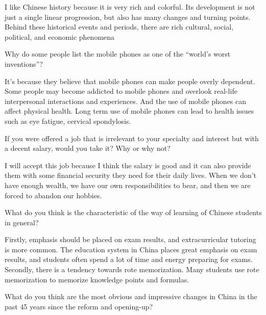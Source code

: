 \documentclass[lang=cn,10pt]{elegantbook}
\begin{document}
\begin{solution}
	I like Chinese history because it is very rich and colorful. Its development is not just a single linear progression, but also has many changes and turning points. Behind these historical events and periods, there are rich cultural, social, political, and economic phenomena
\end{solution}
\begin{example}
	Why do some people list the mobile phones as one of the “world’s worst inventions”? 
\end{example}
\begin{solution}
	It's because they believe that mobile phones can make people overly dependent. Some people may become addicted to mobile phones and overlook real-life interpersonal interactions and experiences. And the use of mobile phones can affect physical health. Long term use of mobile phones can lead to health issues such as eye fatigue, cervical spondylosis.
\end{solution}
\begin{example}
	 If you were offered a job that is irrelevant to your specialty and interest but with a decent salary, would you take it? Why or why not?
\end{example}
\begin{solution}
	I will accept this job because I think the salary is good and it can also provide them with some financial security they need for their daily lives. When we don't have enough wealth, we have our own responsibilities to bear, and then we are forced to abandon our hobbies.
\end{solution}
\begin{example}
	What do you think is the characteristic of the way of learning of Chinese students in general?
\end{example}
\begin{solution}
	Firstly, emphasis should be placed on exam results, and extracurricular tutoring is more common. The education system in China places great emphasis on exam results, and students often spend a lot of time and energy preparing for exams. Secondly, there is a tendency towards rote memorization. Many students use rote memorization to memorize knowledge points and formulas.
\end{solution}
\begin{example}
	What do you think are the most obvious and impressive changes in China in the past 45 years since the reform and opening-up? 
\end{example}
\end{document}
